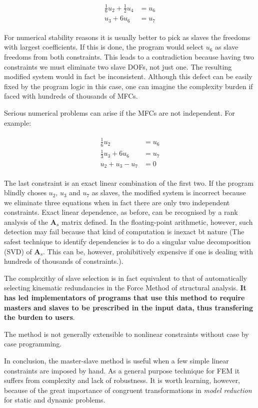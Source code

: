 \documentclass[10pt,b5paper,titlepage]{book}
\newcommand{\m}{\mathbf}
\newenvironment{eqarray}
{
    \begin{eqnarray}
        \begin{aligned}
}
{
        \end{aligned}
    \end{eqnarray}
}
\begin{document}
\begin{eqarray}
    \frac{1}{6} u_2 + \frac{1}{2} u_4 &= u_6 \\
    u_3 + 6 u_6 &= u_7
\end{eqarray}

For numerical stability reasons it is usually better to pick as slaves the freedoms
with largest coefficients. If this is done, the program would select $ u_6 $ as
slave freedoms from both constraints. This leads to a contradiction because
having two constraints we must eliminate two slave DOFs, not just one. The resulting
modified system would in fact be inconsistent. Although this defect can be easily fixed
by the program logic in this case, one can imagine the complexity burden if faced
with hundreds of thousands of MFCs.

Serious numerical problems can arise if the MFCs are not independent. For example:

\begin{eqarray}
    \frac{1}{6} u_2 &= u_6 \\
    \frac{1}{3} u_3 + 6 u_6 &= u_7 \\
    u_2 + u_3 - u_7 &= 0
\end{eqarray}

The last constraint is an exact linear combination of the first two. If the program
blindly choses $ u_2 $, $ u_3 $ and $ u_7 $ as slaves, the modified system is
incorrect because we eliminate three equations when in fact there are only two
independent constraints. Exact linear dependence, as before, can be recognised by
a rank analysis of the $ \m{A}_s $ matrix defined. In the floating-point
arithmetic, however, such detection may fail because that kind of computation is
inexact bt nature (The safest technique to identify dependencies is to do
a singular value decomposition (SVD) of $ \m{A}_s $. This can be, however,
prohibitively expensive if one is dealing with hundreds of thousands of constraints.).

The complexithy of slave selection is in fact equivalent to that of automatically
selecting kinematic redundancies in the Force Method of structural analysis.
\textbf{It has led implementators of programs that use this method to require masters}
\textbf{and slaves to be prescribed in the input data, thus transfering the burden}
\textbf{to users}.

The method is not generally extensible to nonlinear constraints without case
by case programming.

In conclusion, the master-slave method is useful when a few simple linear constraints
are imposed by hand. As a general purpose technique for FEM it suffers from
complexity and lack of robustness. It is worth learning, however, because of the
great importance of congruent transformations in
\textit{model reduction} for static and dynamic problems.
\end{document}
